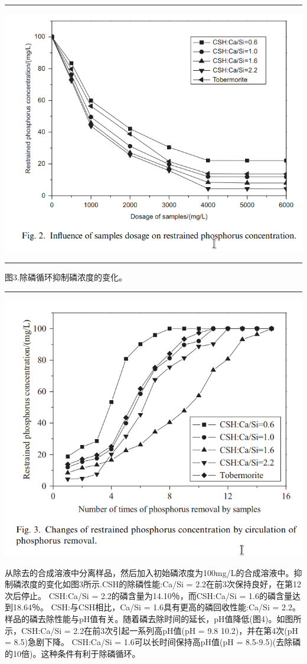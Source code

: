 \documentclass[11pt]{article}
\begin{document}
\noindent\rule{\textwidth}{0.5pt}
\includegraphics[scale=0.3]{fig.2.png}

\noindent\rule{\textwidth}{0.5pt}
图3.除磷循环抑制磷浓度的变化。

\noindent\rule{\textwidth}{0.5pt}
\includegraphics[scale=0.5]{fig.3.png}

从除去的合成溶液中分离样品，然后加入初始磷浓度为100mg/L的合成溶液中。抑制磷浓度的变化如图3所示.CSH的除磷性能:Ca/Si = 2.2在前3次保持良好，在第12次后停止。 CSH:Ca/Si = 2.2的磷含量为14.10％，而CSH:Ca/Si = 1.6的磷含量达到18.64％。 CSH:与CSH相比，Ca/Si = 1.6具有更高的磷回收性能:Ca/Si = 2.2。样品的磷去除性能与pH值有关。随着磷去除时间的延长，pH值降低(图4)。如图所示，CSH:Ca/Si = 2.2在前3次引起一系列高pH值(pH = 9.8 10.2)，并在第4次(pH = 8.5)急剧下降。 CSH:Ca/Si = 1.6可以长时间保持高pH值(pH = 8.5-9.5)(去除磷的10倍)。这种条件有利于除磷循环。
\end{document}
